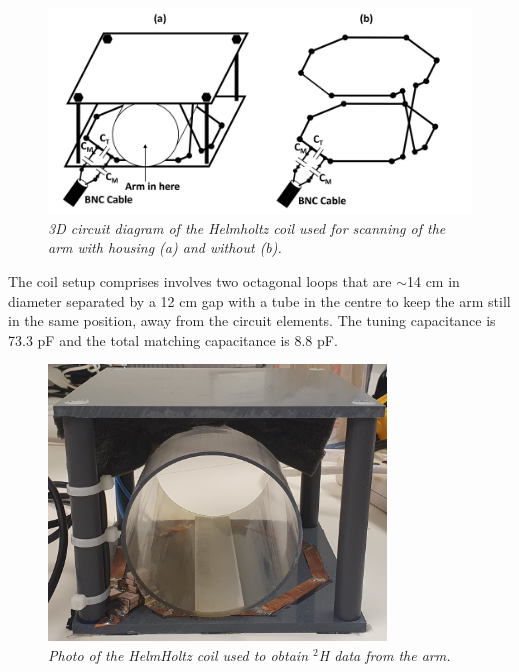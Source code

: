 \begin{figure}
    \centering
    \includegraphics[width=1\textwidth]{Figures/Theory/3D_Helmholtz.png}
    \caption{\textit{3D circuit diagram of the Helmholtz coil used for scanning of the arm with housing (a) and without (b).}}
    \label{fig:theory:3D_Helmholtz}
\end{figure}

The coil setup comprises involves two octagonal loops that are $\sim$14 cm in diameter separated by a 12 cm gap with a tube in the centre to keep the arm still in the same position, away from the circuit elements. The tuning capacitance is 73.3 pF and the total matching capacitance is 8.8 pF.

\begin{figure}
    \centering
    \includegraphics[width=0.8\textwidth]{Figures/Theory/HelmHoltz_Coil.jpg}
    \caption{\textit{Photo of the HelmHoltz coil used to obtain $^2$H data from the arm.}}
    \label{fig:theory:HelmHoltz_pic}
\end{figure}